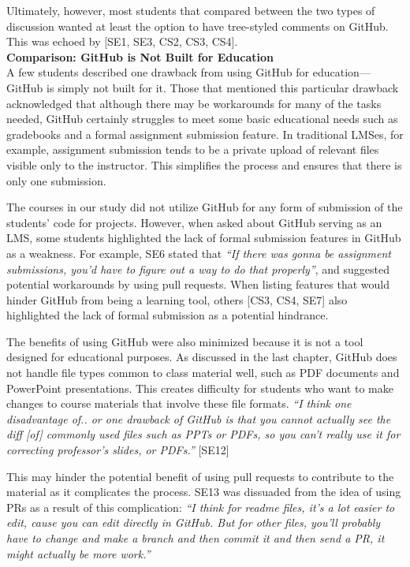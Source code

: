 Ultimately, however, most students that compared between the two types of discussion wanted at least the option to have tree-styled comments on GitHub. This was echoed by [SE1, SE3, CS2, CS3, CS4]. \\

\textbf{Comparison: GitHub is Not Built for Education} \\
A few students described one drawback from using GitHub for education---GitHub is simply not built for it. Those that mentioned this particular drawback acknowledged that although there may be workarounds for many of the tasks needed, GitHub certainly struggles to meet some basic educational needs such as gradebooks and a formal assignment submission feature. In traditional LMSes, for example, assignment submission tends to be a private upload of relevant files visible only to the instructor. This simplifies the process and ensures that there is only one submission.

The courses in our study did not utilize GitHub for any form of submission of the students' code for projects. However, when asked about GitHub serving as an LMS, some students highlighted the lack of formal submission features in GitHub as a weakness. For example, SE6 stated that \textit{``If there was gonna be assignment submissions, you'd have to figure out a way to do that properly''}, and suggested potential workarounds by using pull requests. When listing features that would hinder GitHub from being a learning tool, others [CS3, CS4, SE7] also highlighted the lack of formal submission as a potential hindrance.

The benefits of using GitHub were also minimized because it is not a tool designed for educational purposes. As discussed in the last chapter, GitHub does not handle file types common to class material well, such as PDF documents and PowerPoint presentations. This creates difficulty for students who want to make changes to course materials that involve these file formats. \textit{``I think one disadvantage of.. or one drawback of GitHub is that you cannot actually see the diff [of] commonly used files such as PPTs or PDFs, so you can't really use it for correcting professor's slides, or PDFs.''} [SE12]

This may hinder the potential benefit of using pull requests to contribute to the material as it complicates the process. SE13 was dissuaded from the idea of using PRs as a result of this complication: \textit{``I think for readme files, it's a lot easier to edit, cause you can edit directly in GitHub. But for other files, you'll probably have to change and make a branch and then commit it and then send a PR, it might actually be more work.''}

